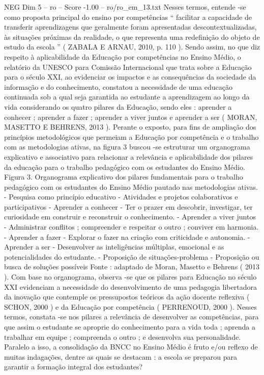 \begin{textsample}{NEG Dim 5 – ro – Score -1.00 – ro/ro\_em\_13.txt}
Nesses termos, entende -se como proposta principal do ensino por competências “ facilitar a capacidade de transferir aprendizagens que geralmente foram apresentadas descontextualizadas, às situações próximas da realidade, o que representa uma redefinição do objeto de estudo da escola ” ( ZABALA E ARNAU, 2010, p. 110 ).
Sendo assim, no que diz respeito à aplicabilidade da Educação por competências no Ensino Médio, o relatório da UNESCO para Comissão Internacional que trata sobre a Educação para o século XXI, ao evidenciar os impactos e as consequências da sociedade da informação e do conhecimento, constatou a necessidade de uma educação continuada sob a qual seja garantida ao estudante a aprendizagem ao longo da vida considerando os quatro pilares da Educação, sendo eles : aprender a conhecer ; aprender a fazer ; aprender a viver juntos e aprender a ser ( MORAN, MASETTO E BEHRENS, 2013 ).
Perante o exposto, para fins de ampliação dos princípios metodológicos que permeiam a Educação por competência e o trabalho com as metodologias ativas, na figura 3 buscou -se estruturar um organograma explicativo e associativo para relacionar a relevância e aplicabilidade dos pilares da educação para o trabalho pedagógico com os estudantes do Ensino Médio.
Figura 3.
Organograma explicativo dos pilares fundamentais para o trabalho pedagógico com os estudantes do Ensino Médio pautado nas metodologias ativas. - Pesquisa como princípio educativo - Atividades e projetos colaborativos e participativos - Aprender a conhecer - Ter o prazer em descobrir, investigar, ter curiosidade em construir e reconstruir o conhecimento. - Aprender a viver juntos - Administrar conflitos ; compreender e respeitar o outro ; conviver em harmonia. - Aprender a fazer - Explorar o fazer na criação com criticidade e autonomia. - Aprender a ser - Desenvolver as inteligências múltiplas, emocional e as potencialidades do estudante. - Proposição de situações-problema - Proposição ou busca de soluções possíveis Fonte : adaptado de Moran, Masetto e Behrens ( 2013 ).
Com base no organograma, observa -se que os pilares para Educação no século XXI evidenciam a necessidade do desenvolvimento de uma pedagogia libertadora da inovação que contemple os pressupostos teóricos da ação docente reflexiva ( SCHON, 2000 ) e da Educação por competência ( PERRENOUD, 2000 ).
Nesses termos, constata -se nos pilares a relevância de desenvolver as competências, para que assim o estudante se aproprie do conhecimento para a vida toda ; aprenda a trabalhar em equipe ; compreenda o outro ; e desenvolva sua personalidade.
Paralelo a isso, a consolidação da BNCC no Ensino Médio é fruto e/ou reflexo de muitas indagações, dentre as quais se destacam : a escola se preparou para garantir a formação integral dos estudantes?

\end{textsample}
